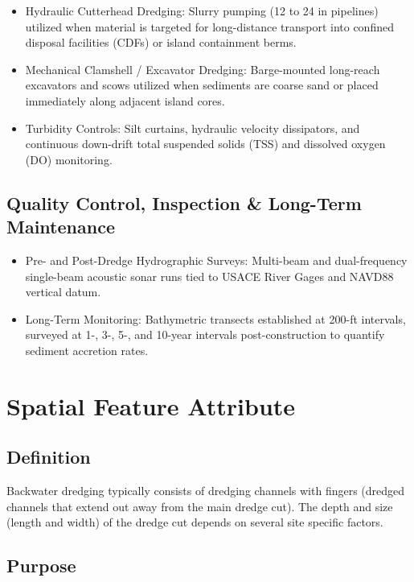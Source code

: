 \documentclass[
  letterpaper,
  DIV=11,
  numbers=noendperiod]{scrreprt}
\begin{document}
\begin{itemize}
\item
  Hydraulic Cutterhead Dredging: Slurry pumping (12 to 24 in pipelines)
  utilized when material is targeted for long-distance transport into
  confined disposal facilities (CDFs) or island containment berms.
\item
  Mechanical Clamshell / Excavator Dredging: Barge-mounted long-reach
  excavators and scows utilized when sediments are coarse sand or placed
  immediately along adjacent island cores.
\item
  Turbidity Controls: Silt curtains, hydraulic velocity dissipators, and
  continuous down-drift total suspended solids (TSS) and dissolved
  oxygen (DO) monitoring.
\end{itemize}

\subsection{Quality Control, Inspection \& Long-Term
Maintenance}\label{quality-control-inspection-long-term-maintenance}

\begin{itemize}
\item
  Pre- and Post-Dredge Hydrographic Surveys: Multi-beam and
  dual-frequency single-beam acoustic sonar runs tied to USACE River
  Gages and NAVD88 vertical datum.
\item
  Long-Term Monitoring: Bathymetric transects established at 200-ft
  intervals, surveyed at 1-, 3-, 5-, and 10-year intervals
  post-construction to quantify sediment accretion rates.
\end{itemize}

\section{Spatial Feature Attribute}\label{spatial-feature-attribute}

\subsection{Definition}\label{definition}

Backwater dredging typically consists of dredging channels with fingers
(dredged channels that extend out away from the main dredge cut). The
depth and size (length and width) of the dredge cut depends on several
site specific factors.

\subsection{Purpose}\label{purpose-2}
\end{document}
